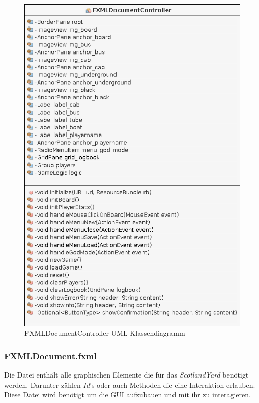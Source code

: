         \begin{figure}[H]
            \centering
            \includegraphics[scale=0.65]{img/uml/fxmlDocumentController.png}   
            \caption{FXMLDocumentController UML-Klassendiagramm}
        \end{figure}


    \subsubsection{FXMLDocument.fxml}
        Die Datei enthält alle graphischen Elemente die für das \textit{ScotlandYard} benötigt werden.
        Darunter zählen \textit{Id}'s oder auch Methoden die eine Interaktion erlauben.
        Diese Datei wird benötigt um die GUI aufzubauen und mit ihr zu interagieren.

